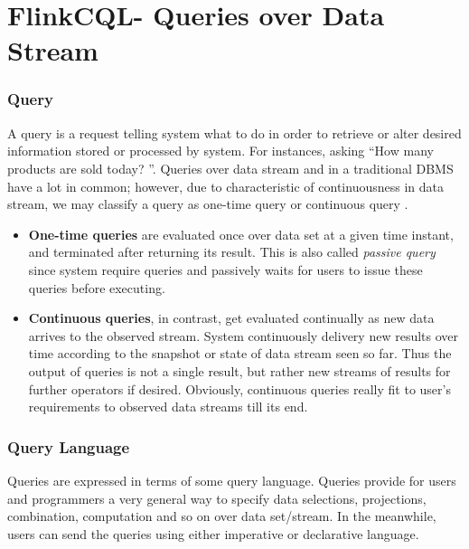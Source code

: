 
\chapter{FlinkCQL- Queries over Data Stream}

\ifpdf
    \graphicspath{{Chapter4/Figs/Raster/}{Chapter4/Figs/PDF/}{Chapter4/Figs/}}
\else
    \graphicspath{{Chapter4/Figs/Vector/}{Chapter4/Figs/}}
\fi


\subsection*{Query}

A query is a request telling system what to do in order to retrieve or alter desired information stored or processed by system. For instances, asking ``How many products are sold today? ''. Queries over data stream and in a traditional DBMS have a lot in common; however, due to characteristic of continuousness in data stream, we may classify a query as one-time query or continuous query \citep{Terry:1992} \citep{Babcock:2002}. 
\begin{itemize}
	\item \textbf{One-time queries} are evaluated once over data set at a given time instant, and terminated after returning its result. This is also called \textit{passive query} \citep{SmartVotex:2011} since system require queries and passively waits for users to issue these queries before executing. 
	\item \textbf{Continuous queries}, in contrast, get evaluated continually as new data arrives to the observed stream. System continuously delivery new results  over time according to the snapshot or state of data stream seen so far. Thus the output of queries is not a single result, but rather new streams of results for further operators if desired. Obviously, continuous queries really fit to user's requirements to observed data streams till its end. 
\end{itemize}



\subsection*{Query Language}
Queries are expressed in terms of some query language. Queries provide for users and programmers a very general way to specify data selections, projections, combination, computation and so on over data set/stream. In the meanwhile, users can send the queries using either imperative or declarative language.

